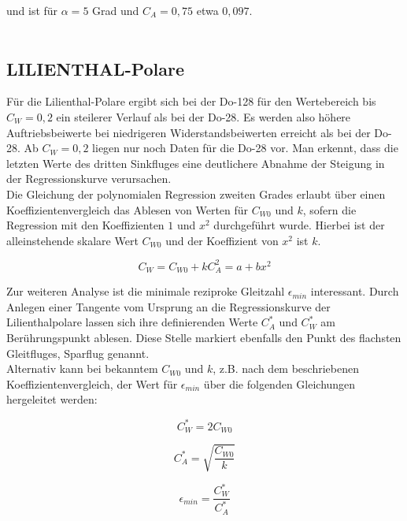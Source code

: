 \vspace{5mm}
\noindent und ist für $\alpha = 5$ Grad und $C_{A} = 0,75$ etwa $0,097$.\\\\

\subsection{LILIENTHAL-Polare}
Für die Lilienthal-Polare ergibt sich bei der Do-128 für den Wertebereich bis $C_{W} = 0,2$ ein steilerer Verlauf als bei der Do-28. Es werden also höhere Auftriebsbeiwerte bei niedrigeren Widerstandsbeiwerten erreicht als bei der Do-28.
Ab $C_{W} = 0,2$ liegen nur noch Daten für die Do-28 vor. Man erkennt, dass die letzten Werte des dritten Sinkfluges eine deutlichere Abnahme der Steigung in der Regressionskurve verursachen.\\
Die Gleichung der polynomialen Regression zweiten Grades erlaubt über einen Koeffizientenvergleich das Ablesen von Werten für $C_{W0}$ und $k$, sofern die Regression mit den Koeffizienten $1$ und $x^{2}$ durchgeführt wurde. Hierbei ist der alleinstehende skalare Wert $C_{W0}$ und der Koeffizient von $x^{2}$ ist $k$.

\begin{equation*}
C_{W} = C_{W0} + k C_{A}^{2} = a + b x^{2}
\end{equation*}

\vspace{5mm}
\noindent Zur weiteren Analyse ist die minimale reziproke Gleitzahl $\epsilon_{min}$ interessant. Durch Anlegen einer Tangente vom Ursprung an die Regressionskurve der Lilienthalpolare lassen sich ihre definierenden Werte $C_{A}^{*}$ und $C_{W}^{*}$ am Berührungspunkt ablesen. Diese Stelle markiert ebenfalls den Punkt des flachsten Gleitfluges, Sparflug genannt.\\
Alternativ kann bei bekanntem $C_{W0}$ und $k$, z.B. nach dem beschriebenen Koeffizientenvergleich, der Wert für $\epsilon_{min}$ über die folgenden Gleichungen hergeleitet werden:

\begin{equation*}
C_{W}^{*} = 2 C_{W0}
\end{equation*}

\begin{equation*}
C_{A}^{*} = \sqrt{\frac{C_{W0}}{k}}
\end{equation*}

\begin{equation*}
\epsilon_{min} = \frac{C_{W}^{*}}{C_{A}^{*}}
\end{equation*}

